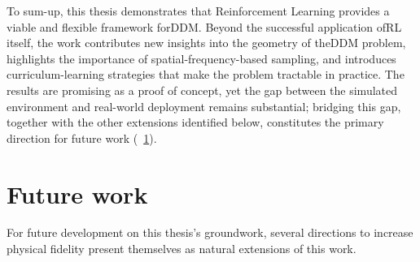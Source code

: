 To sum-up, this thesis demonstrates that Reinforcement Learning provides a viable and flexible framework for\gls{DDM}. Beyond the successful application of\gls{RL} itself, the work contributes new insights into the geometry of the\gls{DDM} problem, highlights the importance of spatial-frequency-based sampling, and introduces curriculum-learning strategies that make the problem tractable in practice. The results are promising as a proof of concept, yet the gap between the simulated environment and real-world deployment remains substantial; bridging this gap, together with the other extensions identified below, constitutes the primary direction for future work (\sectionname~\ref{cap:future_works}).

\section{Future work}
\label{cap:future_works}
For future development on this thesis's groundwork, several directions to increase physical fidelity present themselves as natural extensions of this work.


